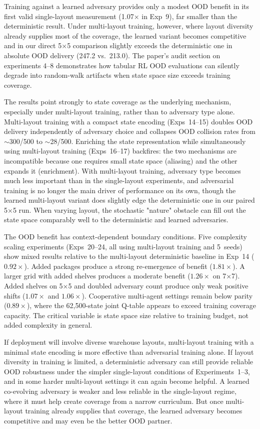 \documentclass[sigconf]{aamas}
\begin{document}
Training against a learned adversary provides only a modest OOD benefit in its
first valid single-layout measurement (1.07$\times$ in Exp~9), far smaller than the
deterministic result. Under multi-layout training, however, where layout diversity
already supplies most of the coverage, the learned variant becomes competitive and
in our direct 5$\times$5 comparison slightly exceeds the deterministic one in
absolute OOD delivery (247.2 vs.\ 213.0). The
paper's audit section on experiments 4--8 demonstrates how tabular RL OOD evaluations
can silently degrade into random-walk artifacts when state space size exceeds
training coverage.

The results point strongly to state coverage as the underlying mechanism, especially
under multi-layout training, rather than to adversary type alone. Multi-layout
training with a compact state encoding (Exps~14--15) doubles OOD delivery independently
of adversary choice and collapses OOD collision rates from $\sim$300/500 to
$\sim$28/500. Enriching the state representation while simultaneously using
multi-layout training (Exps~16--17) backfires: the two mechanisms are incompatible
because one requires small state space (aliasing) and the other expands it
(enrichment). With multi-layout training, adversary type becomes much less
important than in the single-layout experiments, and adversarial training is no
longer the main driver of performance on its own, though the learned multi-layout
variant does slightly edge the deterministic one in our paired 5$\times$5 run.
When varying layout, the
stochastic "nature" obstacle can fill out the state space comparably well to the
deterministic and learned adversaries.

The OOD benefit has context-dependent boundary conditions. Five complexity
scaling experiments (Exps~20--24, all using multi-layout training and 5~seeds) show mixed results
relative to the multi-layout deterministic baseline in Exp~14 ($0.92\times$).
Added packages produce a strong re-emergence of
benefit ($1.81\times$). A larger grid with added shelves produces a moderate
benefit ($1.26\times$ on 7$\times$7). Added shelves on 5$\times$5 and doubled
adversary count produce only weak positive shifts ($1.07\times$ and
$1.06\times$). Cooperative multi-agent settings remain below parity
($0.89\times$), where the 62{,}500-state joint Q-table appears to exceed
training coverage capacity. The critical variable is state space size relative
to training budget, not added complexity in general.

If deployment will involve diverse warehouse layouts, multi-layout
training with a minimal state encoding is more effective than adversarial training
alone. If layout diversity in training is limited, a deterministic adversary can
still provide reliable OOD robustness under the simpler single-layout conditions
of Experiments~1--3, and in some harder multi-layout settings it can again become
helpful. A learned co-evolving adversary is weaker and less reliable in the
single-layout regime, where it must help create coverage from a narrow
curriculum. But once multi-layout training already supplies that coverage, the
learned adversary becomes competitive and may even be the better OOD partner.
\end{document}
